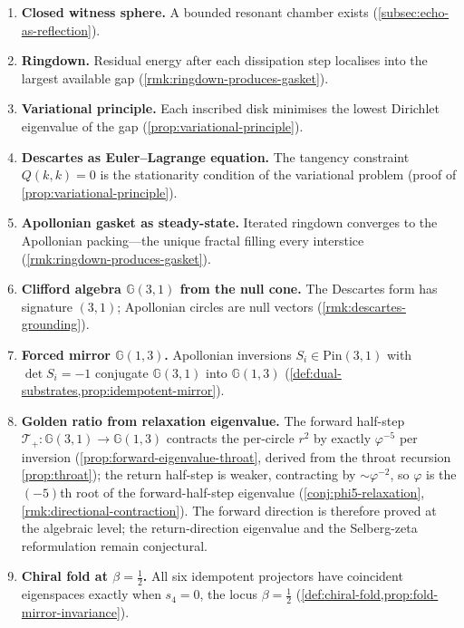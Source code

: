 \documentclass[11pt,a4paper]{article}
\theoremstyle{plain}
\theoremstyle{definition}
\theoremstyle{remark}
\numberwithin{equation}{section}
\newcommand{\Cl}{\mathbb{G}}
\newcommand{\vp}{\varphi}
\begin{document}
\begin{enumerate}
\item \textbf{Closed witness sphere.}
  A bounded resonant chamber exists (\cref{subsec:echo-as-reflection}).

\item \textbf{Ringdown.}
  Residual energy after each dissipation step localises into the largest
  available gap (\cref{rmk:ringdown-produces-gasket}).

\item \textbf{Variational principle.}
  Each inscribed disk minimises the lowest Dirichlet eigenvalue of the
  gap (\cref{prop:variational-principle}).

\item \textbf{Descartes as Euler--Lagrange equation.}
  The tangency constraint \(Q(k,k)=0\) is the stationarity condition of
  the variational problem (proof of \cref{prop:variational-principle}).

\item \textbf{Apollonian gasket as steady-state.}
  Iterated ringdown converges to the Apollonian packing---the unique
  fractal filling every interstice (\cref{rmk:ringdown-produces-gasket}).

\item \textbf{Clifford algebra \(\Cl(3,1)\) from the null cone.}
  The Descartes form has signature \((3,1)\); Apollonian circles are
  null vectors (\cref{rmk:descartes-grounding}).

\item \textbf{Forced mirror \(\Cl(1,3)\).}
  Apollonian inversions \(S_i\in\mathrm{Pin}(3,1)\) with \(\det S_i=-1\)
  conjugate \(\Cl(3,1)\) into \(\Cl(1,3)\)
  (\cref{def:dual-substrates,prop:idempotent-mirror}).

\item \textbf{Golden ratio from relaxation eigenvalue.}
  The forward half-step \(\mathcal{T}_{+}\colon\Cl(3,1)\to\Cl(1,3)\)
  contracts the per-circle \(r^2\) by exactly \(\vp^{-5}\) per
  inversion (\cref{prop:forward-eigenvalue-throat}, derived from the
  throat recursion \cref{prop:throat}); the return half-step is
  weaker, contracting by \(\sim\vp^{-2}\), so \(\vp\) is the
  \((-5)\)th root of the forward-half-step eigenvalue
  (\cref{conj:phi5-relaxation},\,\cref{rmk:directional-contraction}).
  The forward direction is therefore proved at the algebraic level;
  the return-direction eigenvalue and the Selberg-zeta reformulation
  remain conjectural.

\item \textbf{Chiral fold at \(\beta=\tfrac12\).}
  All six idempotent projectors have coincident eigenspaces exactly when
  \(s_4=0\), the locus \(\beta=\tfrac12\)
  (\cref{def:chiral-fold,prop:fold-mirror-invariance}).


\end{enumerate}
\end{document}
